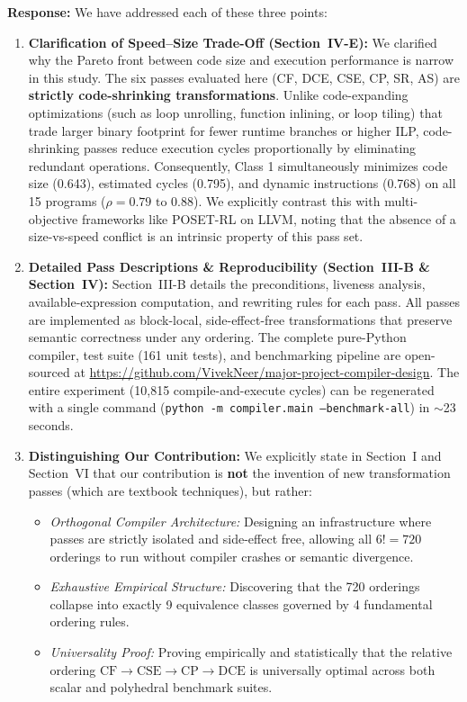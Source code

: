 \documentclass[10pt,a4paper]{article}
\begin{document}
\noindent \textbf{Response:} We have addressed each of these three points:
\begin{enumerate}[itemsep=2pt,parsep=0pt,topsep=2pt]
    \item \textbf{Clarification of Speed--Size Trade-Off (Section~IV-E):} We clarified why the Pareto front between code size and execution performance is narrow in this study. The six passes evaluated here (CF, DCE, CSE, CP, SR, AS) are \textbf{strictly code-shrinking transformations}. Unlike code-expanding optimizations (such as loop unrolling, function inlining, or loop tiling) that trade larger binary footprint for fewer runtime branches or higher ILP, code-shrinking passes reduce execution cycles proportionally by eliminating redundant operations. Consequently, Class 1 simultaneously minimizes code size (0.643), estimated cycles (0.795), and dynamic instructions (0.768) on all 15 programs ($\rho = 0.79 \text{ to } 0.88$). We explicitly contrast this with multi-objective frameworks like POSET-RL on LLVM, noting that the absence of a size-vs-speed conflict is an intrinsic property of this pass set.
    \item \textbf{Detailed Pass Descriptions \& Reproducibility (Section~III-B \& Section~IV):}
    Section~III-B details the preconditions, liveness analysis, available-expression computation, and rewriting rules for each pass. All passes are implemented as block-local, side-effect-free transformations that preserve semantic correctness under any ordering. The complete pure-Python compiler, test suite (161 unit tests), and benchmarking pipeline are open-sourced at \url{https://github.com/VivekNeer/major-project-compiler-design}. The entire experiment (10,815 compile-and-execute cycles) can be regenerated with a single command (\texttt{python -m compiler.main --benchmark-all}) in $\sim$23 seconds.
    \item \textbf{Distinguishing Our Contribution:} We explicitly state in Section~I and Section~VI that our contribution is \textbf{not} the invention of new transformation passes (which are textbook techniques), but rather:
    \begin{itemize}[itemsep=1pt,parsep=0pt]
        \item \textit{Orthogonal Compiler Architecture:} Designing an infrastructure where passes are strictly isolated and side-effect free, allowing all $6! = 720$ orderings to run without compiler crashes or semantic divergence.
        \item \textit{Exhaustive Empirical Structure:} Discovering that the 720 orderings collapse into exactly 9 equivalence classes governed by 4 fundamental ordering rules.
        \item \textit{Universality Proof:} Proving empirically and statistically that the relative ordering $\text{CF} \to \text{CSE} \to \text{CP} \to \text{DCE}$ is universally optimal across both scalar and polyhedral benchmark suites.
    \end{itemize}
\end{enumerate}
\end{document}
